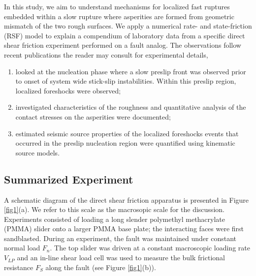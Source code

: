 \documentclass[preprint,1p, 10pt,authoryear]{elsarticle}
\begin{document}
In this study, we aim to understand mechanisms for localized fast ruptures embedded within a slow rupture where asperities are formed from geometric mismatch of the two rough surfaces. We apply a numerical rate- and state-friction (RSF) model \citep{Dieterich1979,Ampuero2008, Rubin2005} to explain a compendium of laboratory data from a specific direct shear friction experiment performed on a fault analog. The observations follow recent publications the reader may consult for experimental details,

\begin{enumerate}
    \item \citet{Selvadurai2015} looked at the nucleation phase where a slow preslip front was observed prior to onset of system wide stick-slip instabilities. Within this preslip region, localized foreshocks were observed;
    \item \citet{Selvadurai2017} investigated characteristics of the roughness and quantitative analysis of the contact stresses on the asperities were documented;
    \item \citet{Selvadurai2019} estimated seismic source properties of the localized foreshocks events that occurred in the preslip nucleation region were quantified using kinematic source models.
\end{enumerate}


\subsection{Summarized Experiment}
\label{GeneralExp}
A schematic diagram of the direct shear friction apparatus is presented in Figure \ref{fig1}(a). We refer to this scale as the macrosopic scale for the discussion. Experiments consisted of loading a long slender polymethyl methacrylate (PMMA) slider onto a larger PMMA base plate; the interacting faces were first sandblasted. During an experiment, the fault was maintained under constant normal load $F_{n}$.  The top slider was driven at a constant macroscopic loading rate $V_{LP}$ and an in-line shear load cell was used to measure the bulk frictional resistance $F_{S}$ along the fault (see Figure \ref{fig1}(b)).   
  
\end{document}
